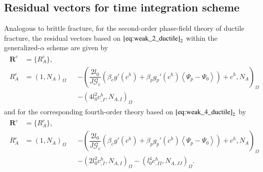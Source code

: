 \subsection{Residual vectors for time integration scheme}
Analogous to brittle fracture, for the second-order phase-field theory of ductile fracture, the residual vectors based on $\eqref{eq:weak_2_ductile}_{2}$ within the generalized-$\alpha$ scheme are given by
\begin{equation} \label{eq:res_vecs_c2_ductile}
	\begin{aligned}
	\begin{alignedat}{2}
		\mathbf{R}^{c}&=\{R_{A}^{c}\}, \\
		R_{A}^{c} &= \left(1,N_{A}\right)_{\Omega} &&- \left(\dfrac{2l_{0}}{J\mathcal{G}_{c}}\left(\beta_{e}g'\left(c^{h}\right)+\beta_{p}g_{p}'\left(c^{h}\right)\left<\Psi_{p}-\Psi_{0}\right>\right)+c^{h},N_{A}\right)_{\Omega} \\
			& &&- \left(4l_{0}^{2}c^{h}_{,I},N_{A,I}\right)_{\Omega}
			\end{alignedat}
	\end{aligned}
\end{equation}
and for the corresponding fourth-order theory based on $\eqref{eq:weak_4_ductile}_{2}$ by
\begin{equation} \label{eq:res_vecs_c4_ductile}
	\begin{aligned}
	\begin{alignedat}{2}
		\mathbf{R}^{c}&=\{R_{A}^{c}\}, \\
		R_{A}^{c} &= \left(1,N_{A}\right)_{\Omega} &&- \left(\dfrac{2l_{0}}{J\mathcal{G}_{c}}\left(\beta_{e}g'\left(c^{h}\right)+\beta_{p}g_{p}'\left(c^{h}\right)\left<\Psi_{p}-\Psi_{0}\right>\right)+c^{h},N_{A}\right)_{\Omega} \\
		 & &&- \left(2l_{0}^{2}c^{h}_{,I},N_{A,I}\right)_{\Omega} - \left(l_{0}^{4}c^{h}_{,II},N_{A,JJ}\right)_{\Omega}.
	\end{alignedat}
	\end{aligned}
\end{equation}